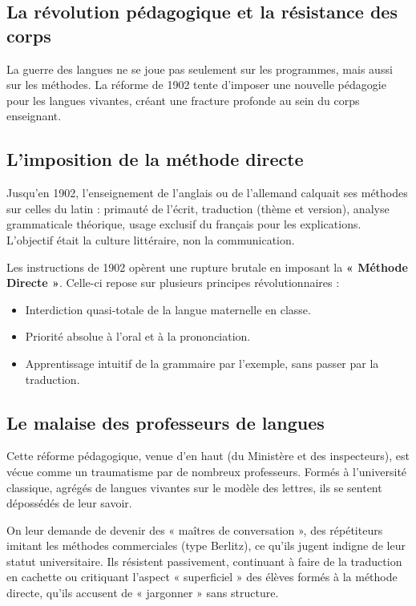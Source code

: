\subsection{La révolution pédagogique et la résistance des corps}

La guerre des langues ne se joue pas seulement sur les programmes, mais aussi sur les méthodes. La
réforme de 1902 tente d'imposer une nouvelle pédagogie pour les langues vivantes, créant une
fracture profonde au sein du corps enseignant.



\subsection{L'imposition de la méthode directe}

Jusqu'en 1902, l'enseignement de l'anglais ou de l'allemand calquait ses méthodes sur celles du
latin : primauté de l'écrit, traduction (thème et version), analyse grammaticale théorique, usage
exclusif du français pour les explications. L'objectif était la culture littéraire, non la
communication.\cite{I-2-1-ref8}

Les instructions de 1902 opèrent une rupture brutale en imposant la \textbf{« Méthode Directe »}.
Celle-ci repose sur plusieurs principes révolutionnaires :

\begin{itemize}\item Interdiction quasi-totale de la langue maternelle en classe.\item Priorité absolue à l'oral et à la prononciation.\item Apprentissage intuitif de la grammaire par l'exemple, sans passer par la traduction.\cite{I-2-1-ref19}\end{itemize}

\subsection{Le malaise des professeurs de langues}

Cette réforme pédagogique, venue d'en haut (du Ministère et des inspecteurs), est vécue comme un
traumatisme par de nombreux professeurs. Formés à l'université classique, agrégés de langues
vivantes sur le modèle des lettres, ils se sentent dépossédés de leur savoir.\cite{I-2-1-ref8}

On leur demande de devenir des « maîtres de conversation », des répétiteurs imitant les méthodes
commerciales (type Berlitz), ce qu'ils jugent indigne de leur statut universitaire. Ils résistent
passivement, continuant à faire de la traduction en cachette ou critiquant l'aspect « superficiel »
des élèves formés à la méthode directe, qu'ils accusent de « jargonner » sans
structure.\cite{I-2-1-ref20}

